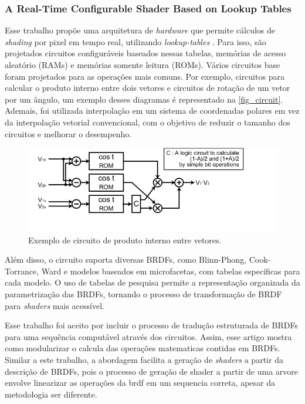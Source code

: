 \subsubsection{A Real-Time Configurable Shader Based on Lookup Tables}


Esse trabalho propõe uma arquitetura de \textit{hardware} que permite cálculos de \textit{shading} por pixel em tempo real, utilizando \textit{lookup-tables} \cite{configurable}. Para isso, são projetados circuitos configuráveis baseados nessas tabelas, memórias de acesso aleatório (RAMs) e memórias somente leitura (ROMs). Vários circuitos base foram projetados para as operações mais comuns. Por exemplo, circuitos para calcular o produto interno entre dois vetores e circuitos de rotação de um vetor por um ângulo, um exemplo desses diagramas é representado na \autoref{fig_circuit}. Ademais, foi utilizada interpolação em um sistema de coordenadas polares em vez da interpolação vetorial convencional, com o objetivo de reduzir o tamanho dos circuitos e melhorar o desempenho.




\begin{figure}[H]
        \caption{\label{fig_circuit}\small Exemplo de circuito de produto interno entre vetores.}
        \begin{center}
            \includegraphics[scale=0.7]{./Imagens/rom-cos-lookup-table.png}
        \end{center}
\end{figure}



Além disso, o circuito suporta diversas BRDFs, como Blinn-Phong, Cook-Torrance, Ward e modelos baseados em microfacetas, com tabelas específicas para cada modelo. O uso de tabelas de pesquisa permite a representação organizada da parametrização das BRDFs, tornando o processo de transformação de BRDF para \textit{shaders} mais acessível.

Esse trabalho foi aceito por incluir o processo de tradução estruturada de BRDFs para uma sequência computável através dos circuitos. Assim, esse artigo mostra como modularizar o calcula das operações matematicas contidas em BRDFs. Similar a este trabalho, a abordagem facilita a geração de \textit{shaders} a partir da descrição de BRDFs, pois o processo de geração de shader a partir de uma arvore envolve linearizar as operações da brdf em um sequencia correta, apesar da metodologia ser diferente.


